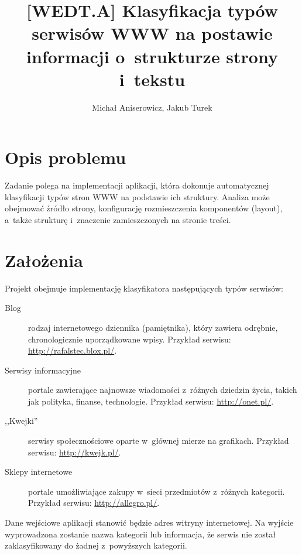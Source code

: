 \documentclass[a4paper,10pt]{article}
\title{[WEDT.A] Klasyfikacja typów serwisów WWW na postawie informacji o~strukturze strony i~tekstu}
\author{Michał Aniserowicz, Jakub Turek}
\date{}
\begin{document}
\maketitle

\section*{Opis problemu}

Zadanie polega na implementacji aplikacji, która dokonuje automatycznej klasyfikacji typów stron WWW na podstawie ich  struktury. Analiza może obejmować źródło strony, konfigurację rozmieszczenia komponentów (layout), a~także strukturę i~znaczenie zamieszczonych na stronie treści.

\section*{Założenia}

Projekt obejmuje implementację klasyfikatora następujących typów serwisów:

\begin{description}
 \item [Blog] rodzaj internetowego dziennika (pamiętnika), który zawiera odrębnie, chronologicznie uporządkowane wpisy. Przykład serwisu: \url{http://rafalstec.blox.pl/}.
 \item [Serwisy informacyjne] portale zawierające najnowsze wiadomości z~różnych dziedzin życia, takich jak polityka, finanse, technologie. Przykład serwisu: \url{http://onet.pl/}.
 \item [,,Kwejki''] serwisy społecznościowe oparte w~głównej mierze na grafikach. Przykład serwisu: \url{http://kwejk.pl/}.
 \item [Sklepy internetowe] portale umożliwiające zakupy w~sieci przedmiotów z~różnych kategorii. Przykład serwisu: \url{http://allegro.pl/}.
\end{description}

Dane wejściowe aplikacji stanowić będzie adres witryny internetowej. Na wyjście wyprowadzona zostanie nazwa kategorii lub informacja, że serwis nie został zaklasyfikowany do żadnej z~powyższych kategorii.
\end{document}
